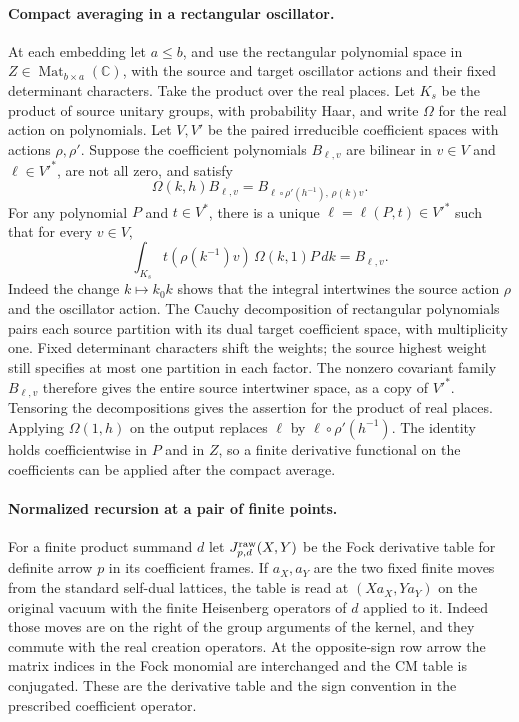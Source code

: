 \paragraph{Compact averaging in a rectangular oscillator.}
At each embedding let \(a\le b\), and use the rectangular polynomial
space in \(Z\in\operatorname{Mat}_{b\times a}(\mathbb C)\), with the
source and target oscillator actions and their fixed determinant
characters. Take the product over the real places. Let \(K_s\) be
the product of source unitary groups, with probability Haar, and
write \(\Omega\) for the real action on polynomials. Let \(V,V'\)
be the paired irreducible coefficient spaces with actions
\(\rho,\rho'\). Suppose the coefficient polynomials \(B_{\ell,v}\)
are bilinear in \(v\in V\) and \(\ell\in V'^*\), are not all zero,
and satisfy
\[
 \Omega(k,h)B_{\ell,v}=B_{\ell\circ\rho'(h^{-1}),\,\rho(k)v}.
\]
For any polynomial \(P\) and \(t\in V^*\), there is a unique
\(\ell=\ell(P,t)\in V'^*\) such that for every \(v\in V\),
\[
 \int_{K_s} t(\rho(k^{-1})v)\,\Omega(k,1)P\,dk=B_{\ell,v}.
\]
Indeed the change \(k\mapsto k_0k\) shows that the integral
intertwines the source action \(\rho\) and the oscillator action.
The Cauchy decomposition of rectangular polynomials pairs each
source partition with its dual target coefficient space, with
multiplicity one. Fixed determinant characters shift the weights;
the source highest weight still specifies at most one partition
in each factor. The nonzero covariant family \(B_{\ell,v}\)
therefore gives the entire source intertwiner space, as a copy
of \(V'^*\). Tensoring the decompositions gives the assertion
for the product of real places. Applying \(\Omega(1,h)\) on the
output replaces \(\ell\) by \(\ell\circ\rho'(h^{-1})\).
The identity holds coefficientwise in \(P\) and in \(Z\), so a
finite derivative functional on the coefficients can be applied
after the compact average.

\paragraph{Normalized recursion at a pair of finite points.}
For a finite product summand \(d\) let \(J_{p,d}^{\rm raw}(X,Y)\)
be the Fock derivative table for definite arrow \(p\) in its
coefficient frames. If \(a_X,a_Y\) are the two fixed finite
moves from the standard self-dual lattices, the table is read at
\((Xa_X,Ya_Y)\) on the original vacuum with the finite
Heisenberg operators of \(d\) applied to it. Indeed those
moves are on the right of the group arguments of the kernel,
and they commute with the real creation operators. At the
opposite-sign row arrow the matrix indices in the Fock
monomial are interchanged and the CM table is conjugated.
These are the derivative table and the sign convention in
the prescribed coefficient operator.


